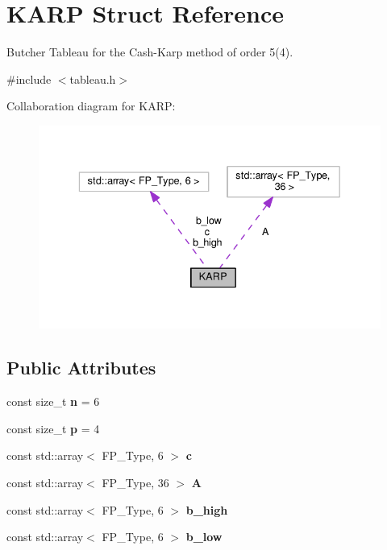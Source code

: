 \hypertarget{structKARP}{}\section{K\+A\+RP Struct Reference}
\label{structKARP}


Butcher Tableau for the Cash-\/\+Karp method of order 5(4).  




{\ttfamily \#include $<$tableau.\+h$>$}



Collaboration diagram for K\+A\+RP\+:\nopagebreak
\begin{figure}[H]
\begin{center}
\leavevmode
\includegraphics[width=336pt]{structKARP__coll__graph}
\end{center}
\end{figure}
\subsection*{Public Attributes}
\begin{DoxyCompactItemize}
\item 
\mbox{\label{structKARP_ae4748bfe9d63b1aaa28a8ea47072f8e3}} 
const size\+\_\+t {\bfseries n} = 6
\item 
\mbox{\label{structKARP_a68a9bee99c22bab5ba56a392e2fa6cb0}} 
const size\+\_\+t {\bfseries p} = 4
\item 
const std\+::array$<$ F\+P\+\_\+\+Type, 6 $>$ {\bfseries c}
\item 
const std\+::array$<$ F\+P\+\_\+\+Type, 36 $>$ {\bfseries A}
\item 
const std\+::array$<$ F\+P\+\_\+\+Type, 6 $>$ {\bfseries b\+\_\+high}
\item 
const std\+::array$<$ F\+P\+\_\+\+Type, 6 $>$ {\bfseries b\+\_\+low}
\end{DoxyCompactItemize}



